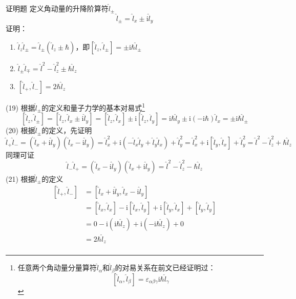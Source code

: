 \begin{question}{证明题}
    定义角动量的升降阶算符$\hat{l}_{\pm}$
    $$
        \hat{l}_{\pm} = \hat{l}_x \pm \mathrm{i}\hat{l}_y
    $$
    证明：
    \begin{enumerate}
        \item[(19)] $\hat{l}_z\hat{l}_{\pm}=\hat{l}_{\pm}\left(\hat{l}_z \pm \hbar\right)$，即$\left[\hat{l}_z, \hat{l}_{\pm}\right]=\pm\mathrm{i}\hbar\hat{l}_{\pm}$
        \item[(20)] $\hat{l}_{\pm}\hat{l}_{\mp}=\hat{l}^2 - \hat{l}_z^2 \pm \hbar\hat{l}_z$
        \item[(21)] $\left[\hat{l}_{+}, \hat{l}_{-}\right]=2\hbar\hat{l}_z$
    \end{enumerate}
\end{question}
\begin{solution}
    (19) 根据$\hat{l}_{\pm}$的定义和量子力学的基本对易式\footnote{任意两个角动量分量算符$\hat{l}_{\alpha}$和$\hat{l}_{\beta}$的对易关系在前文已经证明过：$$\left[\hat{l}_{\alpha}, \hat{l}_{\beta}\right]=\varepsilon_{\alpha\beta\gamma}\mathrm{i}\hbar\hat{l}_{\gamma}$$}
    $$
        \left[\hat{l}_z, \hat{l}_{\pm}\right]
        =\left[\hat{l}_z, \hat{l}_x\pm\mathrm{i}\hat{l}_y\right]
        =\left[\hat{l}_z, \hat{l}_x\right]\pm\mathrm{i}\left[\hat{l}_z, \hat{l}_y\right]
        =\mathrm{i}\hbar\hat{l}_y\pm\mathrm{i}(-\mathrm{i}\hbar)\hat{l}_x
        =\pm\mathrm{i}\hbar\hat{l}_{\pm}
    $$
    (20) 根据$\hat{l}_{\pm}$的定义，先证明
    $$
        \hat{l}_{+}\hat{l}_{-}
        =\left(\hat{l}_x+\mathrm{i}\hat{l}_y\right)\left(\hat{l}_x-\mathrm{i}\hat{l}_y\right)
        =\hat{l}_x^2+\mathrm{i}\left(-\hat{l}_x\hat{l}_y+\hat{l}_y\hat{l}_x\right)+\hat{l}_y^2
        =\hat{l}_x^2+\mathrm{i}\left[\hat{l}_y, \hat{l}_x\right]+\hat{l}_y^2
        =\hat{l}^2-\hat{l}_z^2+\hbar\hat{l}_z
    $$
    同理可证
    $$
        \hat{l}_{-}\hat{l}_{+}=\left(\hat{l}_x-\mathrm{i}\hat{l}_y\right)\left(\hat{l}_x+\mathrm{i}\hat{l}_y\right)=\hat{l}^2-\hat{l}_z^2-\hbar\hat{l}_z
    $$
    (21) 根据$\hat{l}_{\pm}$的定义
    $$
        \begin{aligned}
            \left[\hat{l}_{+}, \hat{l}_{-}\right]
             & = [\hat{l}_x+\mathrm{i}\hat{l}_y,\hat{l}_x-\mathrm{i}\hat{l}_y]                                               \\
             & = [\hat{l}_x,\hat{l}_x]-\mathrm{i}[\hat{l}_x,\hat{l}_y]+\mathrm{i}[\hat{l}_y,\hat{l}_x]+[\hat{l}_y,\hat{l}_y] \\
             & = 0-\mathrm{i}(\mathrm{i}\hbar\hat{l}_z)+\mathrm{i}(-\mathrm{i}\hbar\hat{l}_z)+0                              \\
             & = 2\hbar\hat{l}_z                                                                                             \\
        \end{aligned}
    $$
\end{solution}

